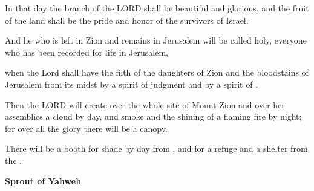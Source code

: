 \documentclass[11pt]{article}
\begin{document}
{\vspace{3em}}


\begin{biblicaloutline}[Isaiah 4:2-6]


\begin{versesection}{2em}
 In that day the branch of the LORD shall be beautiful and glorious,
\poetryline and the fruit of the land shall be the pride and honor
\poetryline of the survivors of Israel.

 And he who is left in Zion and remains in Jerusalem will be called holy,
\poetryline everyone who has been recorded for life in Jerusalem,
\end{versesection}


\begin{versesection}{2em}
 when the Lord shall have  the filth of the daughters of Zion
\poetryline and  the bloodstains of Jerusalem from its midst
\poetryline by a spirit of judgment and by a spirit of .

 Then the LORD will create over the whole site of Mount Zion
\poetryline and over her assemblies
\poetryline a cloud by day, and smoke and the shining of a flaming fire by night;
\poetryline for over all the glory there will be a canopy.

 There will be a booth for shade by day from ,
\poetryline and for a refuge and a shelter from the .
\end{versesection}

\end{biblicaloutline}

\vspace{3em}
{\large\bfseries Sprout of Yahweh}
\vspace{1em}
\end{document}
